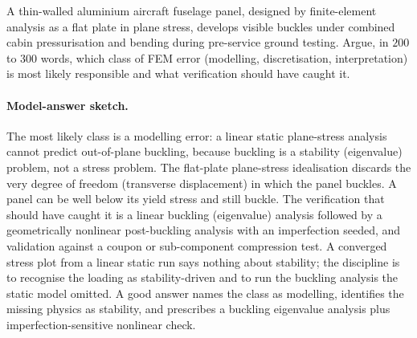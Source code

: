 \begin{exercise}
A thin-walled aluminium aircraft fuselage panel, designed by
finite-element analysis as a flat plate in plane stress, develops
visible buckles under combined cabin pressurisation and bending
during pre-service ground testing. Argue, in $200$ to $300$ words,
which class of FEM error (modelling, discretisation, interpretation)
is most likely responsible and what verification should have
caught it.

\paragraph{Model-answer sketch.} The most likely class is a modelling
error: a linear static plane-stress analysis cannot predict
out-of-plane buckling, because buckling is a stability (eigenvalue)
problem, not a stress problem. The flat-plate plane-stress idealisation
discards the very degree of freedom (transverse displacement) in which
the panel buckles. A panel can be well below its yield stress and still
buckle. The verification that should have caught it is a linear
buckling (eigenvalue) analysis followed by a geometrically nonlinear
post-buckling analysis with an imperfection seeded, and validation
against a coupon or sub-component compression test. A converged stress
plot from a linear static run says nothing about stability; the
discipline is to recognise the loading as stability-driven and to run
the buckling analysis the static model omitted. A good answer names the
class as modelling, identifies the missing physics as stability, and
prescribes a buckling eigenvalue analysis plus imperfection-sensitive
nonlinear check.
\end{exercise}

